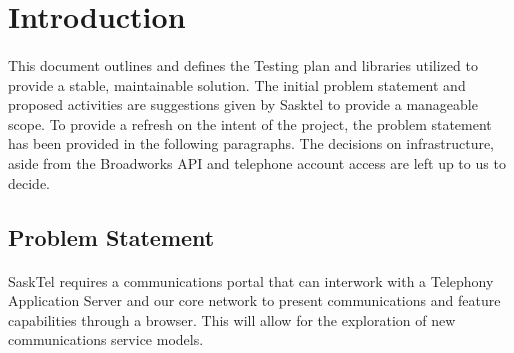 \documentclass[12pt]{article}
\begin{document}
\pagestyle{plain} %

\tableofcontents %
\cleardoublepage %

\listoffigures %
\cleardoublepage %

\listoftables %
\cleardoublepage %

\pagestyle{plain} %


\doublespacing %



\section{Introduction}
\paragraph{}
	This document outlines and defines the Testing plan and libraries utilized to provide a stable, maintainable solution. The initial problem statement and proposed activities are suggestions given by Sasktel to provide a manageable scope. To provide a refresh on the intent of the project, the problem statement has been provided in the following paragraphs. The decisions on infrastructure, aside from the Broadworks API and telephone account access are left up to us to decide. 
\subsection{Problem Statement}
\paragraph{} 
	SaskTel requires a communications portal that can interwork with a Telephony Application Server and our core network to present communications and feature capabilities through a browser.  This will allow for the exploration of new communications service models. 
\end{document}
